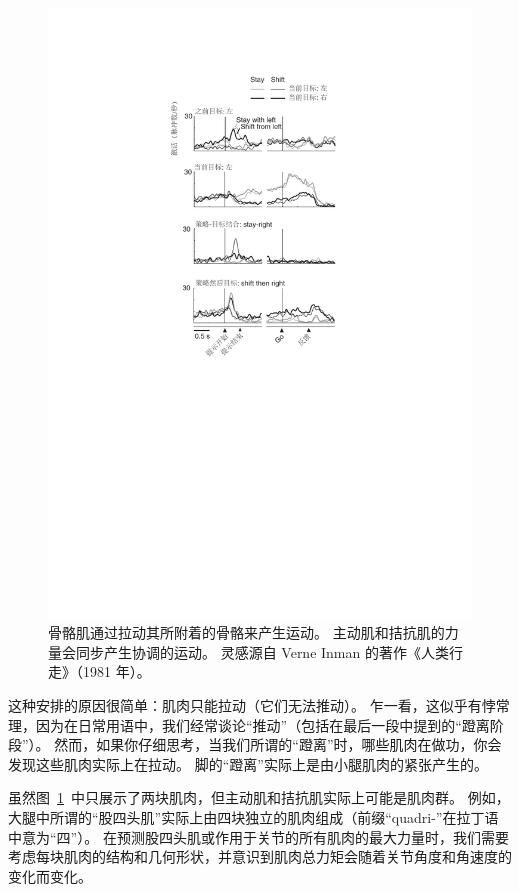 \begin{figure}[!htb]
	\centering
	\includegraphics[width=1.0\linewidth]{chap6/6_11}
	\caption{骨骼肌通过拉动其所附着的骨骼来产生运动。
		主动肌和拮抗肌的力量会同步产生协调的运动。
		灵感源自 Verne Inman 的著作《人类行走》（1981 年）。 \label{fig:6_11}}
\end{figure}


这种安排的原因很简单：肌肉只能拉动（它们无法推动）。
乍一看，这似乎有悖常理，因为在日常用语中，我们经常谈论“推动”（包括在最后一段中提到的“蹬离阶段”）。
然而，如果你仔细思考，当我们所谓的“蹬离”时，哪些肌肉在做功，你会发现这些肌肉实际上在拉动。
脚的“蹬离”实际上是由小腿肌肉的紧张产生的。


虽然图~\ref{fig:6_11}~中只展示了两块肌肉，但主动肌和拮抗肌实际上可能是肌肉群。
例如，大腿中所谓的“股四头肌”实际上由四块独立的肌肉组成（前缀“quadri-”在拉丁语中意为“四”）。
在预测股四头肌或作用于关节的所有肌肉的最大力量时，我们需要考虑每块肌肉的结构和几何形状，并意识到肌肉总力矩会随着关节角度和角速度的变化而变化。


